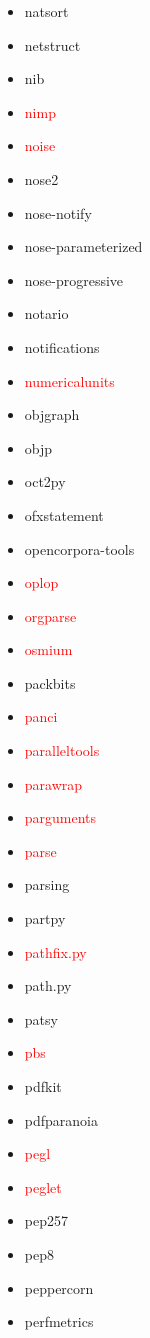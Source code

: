 \documentclass{l4proj}
\begin{document}
\begin{appendices}
{\begin{itemize}
\item natsort
\item netstruct
\item nib
\item\textcolor{red}{nimp}
\item\textcolor{red}{noise}
\item nose2
\item nose-notify
\item nose-parameterized
\item nose-progressive
\item notario
\item notifications
\item\textcolor{red}{numericalunits}
\item objgraph
\item objp
\item oct2py
\item ofxstatement
\end{itemize}
}%
\clearpage
\noindent\parbox[t]{0.32\textwidth}{\raggedright%
\begin{itemize}
\item opencorpora-tools
\item\textcolor{red}{oplop}
\item\textcolor{red}{orgparse}
\item\textcolor{red}{osmium}
\item packbits
\item\textcolor{red}{panci}
\item\textcolor{red}{paralleltools}
\item\textcolor{red}{parawrap}
\item\textcolor{red}{parguments}
\item\textcolor{red}{parse}
\item parsing
\item partpy
\item\textcolor{red}{pathfix.py}
\item path.py
\item patsy
\item\textcolor{red}{pbs}
\item pdfkit
\item pdfparanoia
\item\textcolor{red}{pegl}
\item\textcolor{red}{peglet}
\item pep257
\item pep8
\item peppercorn
\item perfmetrics

\end{itemize}}
\end{appendices}
\end{document}
